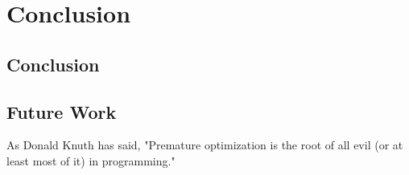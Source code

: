 \chapter{Conclusion}
\label{sec:conclusion}
\minitoc
\vspace*{1cm}

\section{Conclusion}

\section{Future Work}
As Donald Knuth has said, "Premature optimization is the root of all evil (or at least most of it) in programming."
